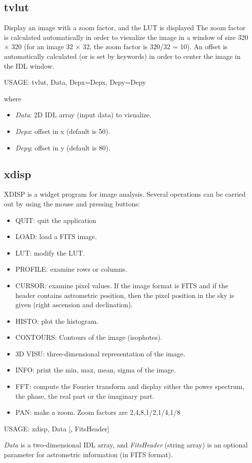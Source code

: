 \subsection{tvlut}
Display an image with a zoom factor, and the LUT is displayed
The zoom factor is calculated automatically in order to visualize
the image in a window of size 320 $\times$ 320 (for an image 32 $\times$ 
32, the
zoom factor is 320/32 = 10). An offset is automatically calculated
(or is set by keywords) in order to center the image in the IDL window. 
{\bf
\begin{center}
     USAGE: tvlut, Data, Depx=Depx, Depy=Depy
\end{center}}
where
\begin{itemize}
\item {\em Data}: 2D IDL array (input data) to visualize.
\item {\em Depx}: offset in x (default is 50).
\item {\em Depy}: offset in y (default is 80).
\end{itemize}

\subsection{xdisp}
XDISP is a widget program for image analysis. Several operations
can be carried out by using the mouse and pressing buttons:
\begin{itemize}
\baselineskip=0.4truecm
\item QUIT: quit the application
\item LOAD: load a FITS image. 
\item LUT: modify the LUT.
\item PROFILE: examine rows or columns.
\item CURSOR: examine pixel values. If the image format is FITS and if
the header contains astrometric position, then the pixel
position in the sky is given (right ascension and declination).
\item HISTO: plot the histogram.
\item CONTOURS: Contours of the image (isophotes).
\item 3D VISU: three-dimensional representation of the image.
\item INFO: print the min, max, mean, sigma of the image.
\item FFT: compute the Fourier transform and display either the power 
spectrum, the phase, the real part or the imaginary part.
\item PAN: make a zoom. Zoom factors are 2,4,8,1/2,1/4,1/8
\end{itemize}
{\bf
\begin{center}
     USAGE: xdisp, Data [, FitsHeader]
\end{center}}
{\em Data} is a two-dimensional IDL array, and {\em FitsHeader} (string array)
is an optional parameter for astrometric information (in FITS format).

